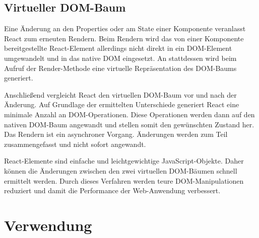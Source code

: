 \subsection{Virtueller DOM-Baum}
Eine Änderung an den Properties oder am State einer Komponente veranlasst React zum erneuten Rendern. Beim Rendern wird das von einer Komponente bereitgestellte React-Element allerdings nicht direkt in ein DOM-Element umgewandelt und in das native DOM eingesetzt. An stattdessen wird beim Aufruf der Render-Methode eine virtuelle Repräsentation des DOM-Baums generiert.

Anschließend vergleicht React den virtuellen DOM-Baum vor und nach der Änderung. Auf Grundlage der ermittelten Unterschiede generiert React eine minimale Anzahl an DOM-Operationen.  Diese Operationen werden dann auf den nativen DOM-Baum angewandt und stellen somit den gewünschten Zustand her. Das Rendern ist ein asynchroner Vorgang. Änderungen werden zum Teil zusammengefasst und nicht sofort angewandt.

React-Elemente sind einfache und leichtgewichtige JavaScript-Objekte. Daher können die Änderungen zwischen den zwei virtuellen DOM-Bäumen schnell ermittelt werden. Durch dieses Verfahren werden teure DOM-Manipulationen reduziert und damit die Performance der Web-Anwendung verbessert.\autocites[vgl.][23\psq,60\psq,90\psq]{Zeigermann.2016}[vgl.][53\psq]{Stefanov.2017}[vgl.][]{Facebook.2018}
\section{Verwendung}


